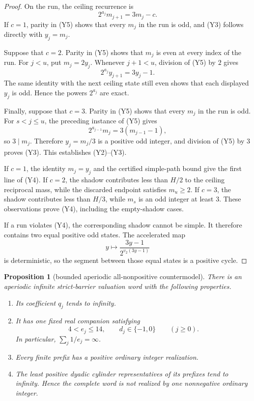 \documentclass[11pt]{article}
\newtheorem{proposition}[theorem]{Proposition}
\begin{document}
\begin{proof}
On the run, the ceiling recurrence is
\[
  2^{a_j}m_{j+1}=3m_j-c.
  \tag{Y5}
\]
If $c=1$, parity in (Y5) shows that every $m_j$ in the run is odd, and
(Y3) follows directly with $y_j=m_j$.

Suppose that $c=2$.  Parity in (Y5) shows that $m_j$ is even at every
index of the run.  For $j<u$, put $m_j=2y_j$.  Whenever $j+1<u$, division
of (Y5) by $2$ gives
\[
  2^{a_j}y_{j+1}=3y_j-1.
\]
The same identity with the next ceiling state still even shows that each
displayed $y_j$ is odd.  Hence the powers $2^{a_j}$ are exact.

Finally, suppose that $c=3$.  Parity in (Y5) shows that every $m_j$ in the
run is odd.  For $s<j\leq u$, the preceding instance of (Y5) gives
\[
  2^{a_{j-1}}m_j=3(m_{j-1}-1),
\]
so $3\mid m_j$.  Therefore $y_j=m_j/3$ is a positive odd integer, and
division of (Y5) by $3$ proves (Y3).  This establishes (Y2)--(Y3).

If $c=1$, the identity $m_j=y_j$ and the certified simple-path bound give
the first line of (Y4).  If $c=2$, the shadow contributes less than $H/2$
to the ceiling reciprocal mass, while the discarded endpoint satisfies
$m_u\geq2$.  If $c=3$, the shadow contributes less than $H/3$, while
$m_s$ is an odd integer at least $3$.  These observations prove (Y4),
including the empty-shadow cases.

If a run violates (Y4), the corresponding shadow cannot be simple.  It
therefore contains two equal positive odd states.  The accelerated map
\[
  y\longmapsto\frac{3y-1}{2^{v_2(3y-1)}}
\]
is deterministic, so the segment between those equal states is a positive
cycle.
\end{proof}

\begin{proposition}[bounded aperiodic all-nonpositive countermodel]
There is an aperiodic infinite strict-barrier valuation word with the
following properties.

\begin{enumerate}
  \item Its coefficient $q_j$ tends to infinity.
  \item It has one fixed real companion satisfying
  \[
    4<e_j\leq14,
    \qquad d_j\in\{-1,0\}\qquad(j\geq0).
    \tag{C1}
  \]
  In particular, $\sum_j1/e_j=\infty$.
  \item Every finite prefix has a positive ordinary integer realization.
  \item The least positive dyadic cylinder representatives of its prefixes
  tend to infinity.  Hence the complete word is not realized by one
  nonnegative ordinary integer.
\end{enumerate}
\end{proposition}
\end{document}
